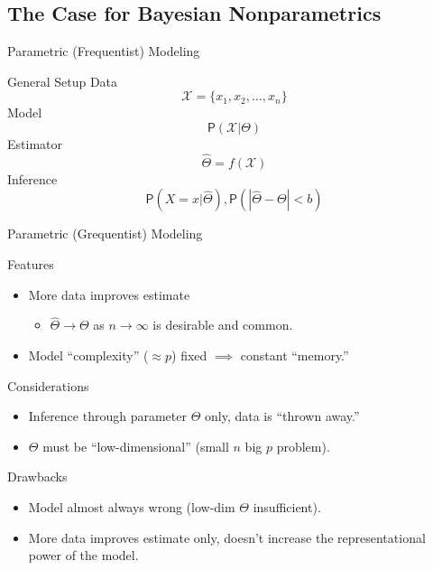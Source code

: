 
\subsection{The Case for Bayesian Nonparametrics}	
	
\begin{frame}[t]{Parametric (Frequentist) Modeling}
\begin{block}{General Setup}
Data 
\[\mathcal{X} = \{x_1, x_2, \ldots, x_n\}\]
Model
\[\mathsf{P}(\mathcal{X} | \Theta)\]
Estimator
\[\hat \Theta = f(\mathcal{X})\]
Inference
\[\mathsf{P}(X=x | \hat \Theta), \mathsf{P}(|\hat \Theta - \Theta| <b)\]%
\end{block}
\end{frame}	


\begin{frame}[t]{Parametric (Grequentist) Modeling}
\begin{exampleblock}{Features}
\begin{itemize}
\item More data improves estimate
\begin{itemize}
\item $\hat \Theta \rightarrow \Theta$ as $n\rightarrow \infty$ is desirable and common.
\end{itemize}
\item Model ``complexity'' ($\approx p$) fixed $\implies$ constant ``memory.''
\end{itemize}
\pause
\end{exampleblock}
\begin{block}{Considerations}
\begin{itemize}
\item Inference through parameter $\Theta$ only, data is ``thrown away.''
\item $\Theta$ must be ``low-dimensional'' (small $n$ big $p$ problem).
\end{itemize}
\end{block}
\pause
\begin{alertblock}{Drawbacks}
\begin{itemize}
\item Model almost always wrong (low-dim $\Theta$ insufficient).
\item More data improves estimate only, doesn't increase the representational power of the model.
\end{itemize}
\end{alertblock}
\end{frame}	

